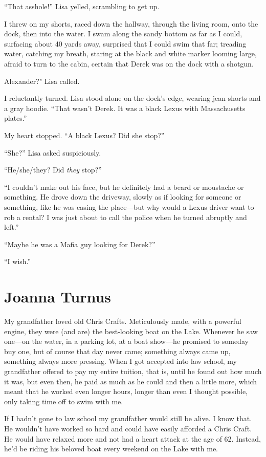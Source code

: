 ``That asshole!'' Lisa yelled, scrambling to get up.

I threw on my shorts, raced down the hallway, through the living room,
onto the dock, then into the water. I swam along the sandy bottom as far
as I could, surfacing about 40 yards away, surprised that I could swim
that far; treading water, catching my breath, staring at the black and
white marker looming large, afraid to turn to the cabin, certain that
Derek was on the dock with a shotgun.

Alexander?" Lisa called.

I reluctantly turned. Lisa stood alone on the dock's edge, wearing jean
shorts and a gray hoodie. ``That wasn't Derek. It was a black Lexus with
Massachusetts plates.''

My heart stopped. ``A black Lexus? Did she stop?''

``She?'' Lisa asked suspiciously.

``He/she/they? Did \emph{they} stop?''

``I couldn't make out his face, but he definitely had a beard or
moustache or something. He drove down the driveway, slowly as if looking
for someone or something, like he was casing the place---but why would a
Lexus driver want to rob a rental? I was just about to call the police
when he turned abruptly and left.''

``Maybe he was a Mafia guy looking for Derek?''

``I wish.''

\chapter{Joanna Turnus}

\titlemark

My grandfather loved old Chris Crafts. Meticulously made, with a
powerful engine, they were (and are) the best-looking boat on the Lake.
Whenever he saw one---on the water, in a parking lot, at a boat
show---he promised to someday buy one, but of course that day never
came; something always came up, something always more pressing. When I
got accepted into law school, my grandfather offered to pay my entire
tuition, that is, until he found out how much it was, but even then, he
paid as much as he could and then a little more, which meant that he
worked even longer hours, longer than even I thought possible, only
taking time off to swim with me.

If I hadn't gone to law school my grandfather would still be alive. I
know that. He wouldn't have worked so hard and could have easily
afforded a Chris Craft. He would have relaxed more and not had a heart
attack at the age of 62. Instead, he'd be riding his beloved boat every
weekend on the Lake with me.

